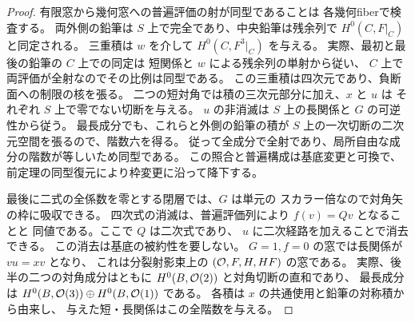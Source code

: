 \begin{proof}
有限窓から幾何窓への普遍評価の射が同型であることは
各幾何fiberで検査する。
両外側の鉛筆は $S$ 上で完全であり、中央鉛筆は残余列で
$H^0(C,F|_C)$ と同定される。
三重積は $w$ を介して $H^0(C,F^3|_C)$ を与える。
実際、最初と最後の鉛筆の $C$ 上での同定は
短関係と $w$ による残余列の単射から従い、
$C$ 上で両評価が全射なのでその比例は同型である。
この三重積は四次元であり、負断面への制限の核を張る。
二つの短対角では積の三次元部分に加え、$x$ と $u$ は
それぞれ $S$ 上で零でない切断を与える。
$u$ の非消滅は $S$ 上の長関係と $G$ の可逆性から従う。
最長成分でも、これらと外側の鉛筆の積が
$S$ 上の一次切断の二次元空間を張るので、階数六を得る。
従って全成分で全射であり、局所自由な成分の階数が等しいため同型である。
この照合と普遍構成は基底変更と可換で、
前定理の同型復元により枠変更に沿って降下する。

最後に二式の全係数を零とする閉層では、$G$ は単元の
スカラー倍なので対角矢の枠に吸収できる。
四次式の消滅は、普遍評価列により $f(v)=Qv$ となることと
同値である。ここで $Q$ は二次式であり、
$u$ に二次経路を加えることで消去できる。
この消去は基底の被約性を要しない。
$G=1,f=0$ の窓では長関係が $vu=xv$ となり、
これは分裂射影束上の $(\mathcal O,F,H,HF)$ の窓である。
実際、後半の二つの対角成分はともに
$H^0(B,\mathcal O(2))$ と対角切断の直和であり、
最長成分は $H^0(B,\mathcal O(3))\oplus H^0(B,\mathcal O(1))$ である。
各積は $x$ の共通使用と鉛筆の対称積から由来し、
与えた短・長関係はこの全階数を与える。
\end{proof}


